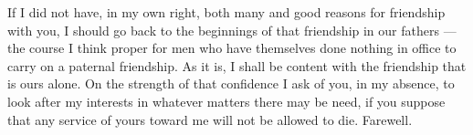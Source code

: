 

 If I did not have, in my own right, both many and good reasons for friendship with you, I should go back to the beginnings of that friendship in our fathers --- the course I think proper for men who have themselves done nothing in office to carry on a paternal friendship. As it is, I shall be content with the friendship that is ours alone. On the strength of that confidence I ask of you, in my absence, to look after my interests in whatever matters there may be need, if you suppose that any service of yours toward me will not be allowed to die. Farewell.
